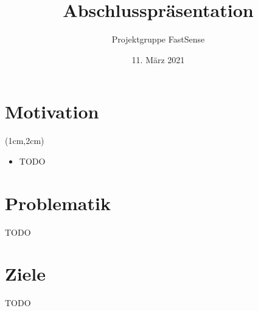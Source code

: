 \documentclass{beamer}
\title{Abschlusspräsentation}
\author{Projektgruppe FastSense}
\date{11. März 2021}
\begin{document}
{
\begin{frame}
\titlepage
\end{frame}}

\section{Motivation}
\begin{frame}{\secname}
\begin{textblock*}{12cm}(1cm,2cm)
\begin{itemize}
\item{TODO}
\end{itemize}
\end{textblock*}
\end{frame}

\section{Problematik}
\begin{frame}{\secname}
TODO
\end{frame}

\section{Ziele}
\begin{frame}{\secname}
TODO
\end{frame}
\end{document}

